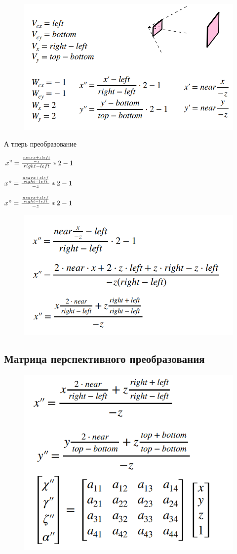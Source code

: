 \documentclass{article}
\begin{document}
\begin{figure} [H]
    \includegraphics[width=0.70\linewidth]{Снимок экрана 2025-04-07 122640.png}
\end{figure}


А тперь преобразование
\vspace{5mm}

$x" =\frac{\frac{nearx+zleft}{-z}}{right - left}*2-1$

\vspace{5mm}

$x"=\frac{\frac{nearx+zlef}{right - left}}{-z}*2-1$

\vspace{5mm}

$x"=\frac{\frac{nearx+zlef}{right - left}}{-z}*2-1$

\begin{figure} [H]
    \includegraphics[width=0.70\linewidth]{Снимок экрана 2025-04-07 122649.png}
\end{figure}

\subsection{Матрица перспективного преобразования}

\begin{figure} [H]
    \includegraphics[width=0.70\linewidth]{Снимок экрана 2025-04-07 122839.png}
\end{figure}
\end{document}
